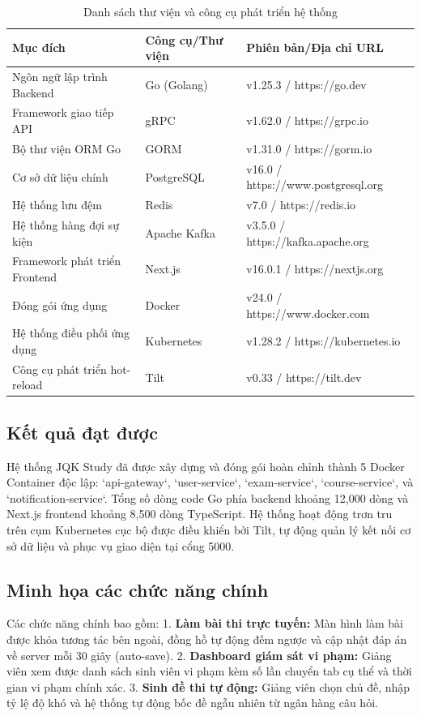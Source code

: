 \documentclass[../DoAn.tex]{subfiles}
\begin{document}
\begin{table}[H]
\centering
    \begin{tabular}{lll}
        \hline
        \textbf{Mục đích} & \textbf{Công cụ/Thư viện} & \textbf{Phiên bản/Địa chỉ URL} \\ \hline
        Ngôn ngữ lập trình Backend & Go (Golang) & v1.25.3 / https://go.dev \\ 
        Framework giao tiếp API & gRPC & v1.62.0 / https://grpc.io \\ 
        Bộ thư viện ORM Go & GORM & v1.31.0 / https://gorm.io \\ 
        Cơ sở dữ liệu chính & PostgreSQL & v16.0 / https://www.postgresql.org \\ 
        Hệ thống lưu đệm & Redis & v7.0 / https://redis.io \\ 
        Hệ thống hàng đợi sự kiện & Apache Kafka & v3.5.0 / https://kafka.apache.org \\ 
        Framework phát triển Frontend & Next.js & v16.0.1 / https://nextjs.org \\ 
        Đóng gói ứng dụng & Docker & v24.0 / https://www.docker.com \\ 
        Hệ thống điều phối ứng dụng & Kubernetes & v1.28.2 / https://kubernetes.io \\ 
        Công cụ phát triển hot-reload & Tilt & v0.33 / https://tilt.dev \\ \hline
    \end{tabular}
    \caption{Danh sách thư viện và công cụ phát triển hệ thống}
    \label{table:my_label}
\end{table}

\subsection{Kết quả đạt được}
Hệ thống JQK Study đã được xây dựng và đóng gói hoàn chỉnh thành 5 Docker Container độc lập: `api-gateway`, `user-service`, `exam-service`, `course-service`, và `notification-service`. Tổng số dòng code Go phía backend khoảng 12,000 dòng và Next.js frontend khoảng 8,500 dòng TypeScript. Hệ thống hoạt động trơn tru trên cụm Kubernetes cục bộ được điều khiển bởi Tilt, tự động quản lý kết nối cơ sở dữ liệu và phục vụ giao diện tại cổng 5000.

\subsection{Minh họa các chức năng chính}
Các chức năng chính bao gồm:
1. \textbf{Làm bài thi trực tuyến:} Màn hình làm bài được khóa tương tác bên ngoài, đồng hồ tự động đếm ngược và cập nhật đáp án về server mỗi 30 giây (auto-save).
2. \textbf{Dashboard giám sát vi phạm:} Giảng viên xem được danh sách sinh viên vi phạm kèm số lần chuyển tab cụ thể và thời gian vi phạm chính xác.
3. \textbf{Sinh đề thi tự động:} Giảng viên chọn chủ đề, nhập tỷ lệ độ khó và hệ thống tự động bốc đề ngẫu nhiên từ ngân hàng câu hỏi.
\end{document}
